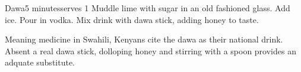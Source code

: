 \begin{recipe}{Dawa}{5 minutes}{serves 1}
Muddle lime with sugar in an old fashioned glass.
Add ice. Pour in vodka.
Mix drink with dawa stick, adding honey to taste.

\freeform Meaning medicine in Swahili, Kenyans cite the dawa as their national
drink. Absent a real dawa stick, dolloping honey and stirring with a spoon
provides an adquate substitute.
\end{recipe}
